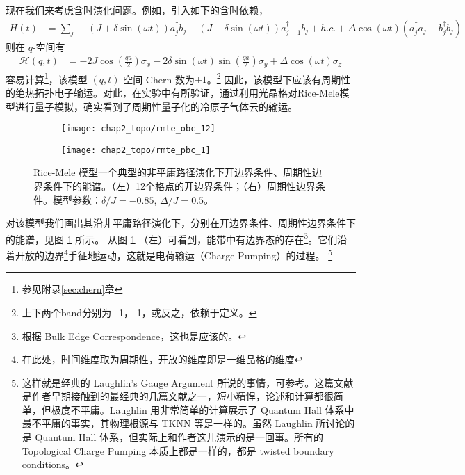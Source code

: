 现在我们来考虑含时演化问题。例如，引入如下的含时依赖，
\begin{align}
H(t) &=\sum_j-(J+\delta\sin(\omega t))a_j^{\dagger}b_j-(J-\delta\sin(\omega t))a_{j+1}^{\dagger}b_j+h.c.+\Delta\cos(\omega t)(a_j^{\dagger}a_j-b_j^{\dagger}b_j)
\end{align}
则在 $q$-空间有
\begin{align}
\mathcal{H}(q,t)
&=-2J\cos(\frac{qa}{2})\sigma_x-2\delta\sin(\omega t)\sin(\frac{qa}{2})\sigma_y+\Delta\cos(\omega t)\sigma_z
\end{align}
容易计算\footnote{参见附录\ref{sec:chern}章}，该模型 $(q,t)$ 空间 Chern 数为$\pm 1$。\footnote{上下两个band分别为+1，-1，或反之，依赖于定义。} 因此，该模型下应该有周期性的绝热拓扑电子输运。对此，在实验中有所验证，通过利用光晶格对Rice-Mele模型进行量子模拟，确实看到了周期性量子化的冷原子气体云的输运。

\begin{figure}[!htb]
\centering
\begin{subfigure}{.48\textwidth}
\texttt{[image: chap2\_topo/rmte\_obc\_12]}
\end{subfigure}
\begin{subfigure}{.48\textwidth}
\texttt{[image: chap2\_topo/rmte\_pbc\_1]}
\end{subfigure}
\caption{Rice-Mele 模型一个典型的非平庸路径演化下开边界条件、周期性边界条件下的能谱。（左）12个格点的开边界条件；（右）周期性边界条件。模型参数：$\delta/J=-0.85$, $\Delta/J=0.5$。}
\label{fig:rmterg}
\end{figure}
对该模型我们画出其沿非平庸路径演化下，分别在开边界条件、周期性边界条件下的能谱，见图 \ref{fig:rmterg} 所示。
从图 \ref{fig:rmterg} （左）可看到，能带中有边界态的存在\footnote{根据 Bulk Edge Correspondence，这也是应该的。}。它们沿着开放的边界\footnote{在此处，时间维度取为周期性，开放的维度即是一维晶格的维度}手征地运动，这就是电荷输运（Charge Pumping）的过程。
\footnote{这样就是经典的 Laughlin's Gauge Argument 所说的事情，可参考。这篇文献是作者早期接触到的最经典的几篇文献之一，短小精悍，论述和计算都很简单，但极度不平庸。Laughlin 用非常简单的计算展示了 Quantum Hall 体系中最不平庸的事实，其物理根源与 TKNN 等是一样的。虽然 Laughlin 所讨论的是 Quantum Hall 体系，但实际上和作者这儿演示的是一回事。所有的 Topological Charge Pumping 本质上都是一样的，都是 twisted boundary conditions。}


